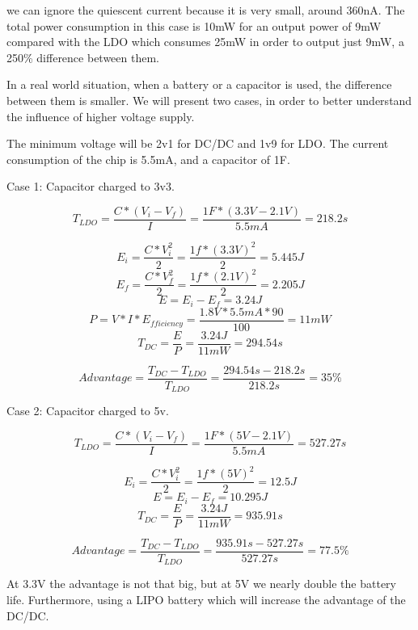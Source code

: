 we can ignore the quiescent current because it is very small, around 360nA. The total power
consumption in this case is 10mW for an output power of 9mW compared with the LDO which consumes
25mW in order to output just 9mW, a 250\% difference between them.

In a real world situation, when a battery or a capacitor is used, the difference between them is
smaller. We will present two cases, in order to better understand the influence of higher
voltage supply.

The minimum voltage will be 2v1 for DC/DC and 1v9 for LDO. The current consumption of the chip is
5.5mA, and a capacitor of 1F.

Case 1: Capacitor charged to 3v3.

$$T_{LDO} = \frac{C * (V_i - V_f)}{I}=\frac{1F * (3.3V - 2.1V)}{5.5mA} = 218.2s $$

$$E_i = \frac{C*V_i^2}{2} = \frac{1f*(3.3V)^2}{2} =5.445J$$
$$E_f = \frac{C*V_f^2}{2} = \frac{1f*(2.1V)^2}{2} =2.205J$$
$$E = E_i - E_f = 3.24J$$
$$P = V*I*E_{fficiency }= \frac{1.8V * 5.5mA * 90}{100} = 11mW$$
$$T_{DC} = \frac{E}{P} = \frac{3.24J}{11mW} =294.54s $$

$$Advantage = \frac{T_{DC} - T_{LDO}}{T_{LDO}} = \frac{294.54s - 218.2s}{218.2s} =  35\%$$

Case 2: Capacitor charged to 5v.

$$T_{LDO} = \frac{C * (V_i - V_f)}{I}=\frac{1F * (5V - 2.1V)}{5.5mA} = 527.27s $$

$$E_i = \frac{C*V_i^2}{2} = \frac{1f*(5V)^2}{2} =12.5J$$
$$E = E_i - E_f = 10.295J$$
$$T_{DC} = \frac{E}{P} = \frac{3.24J}{11mW} =935.91s $$

$$Advantage = \frac{T_{DC} - T_{LDO}}{T_{LDO}} = \frac{935.91s - 527.27s}{527.27s} = 77.5\%$$

At 3.3V the advantage is not that big, but at 5V we nearly double the battery life. Furthermore, using a LIPO
battery which will increase the advantage of the DC/DC.


